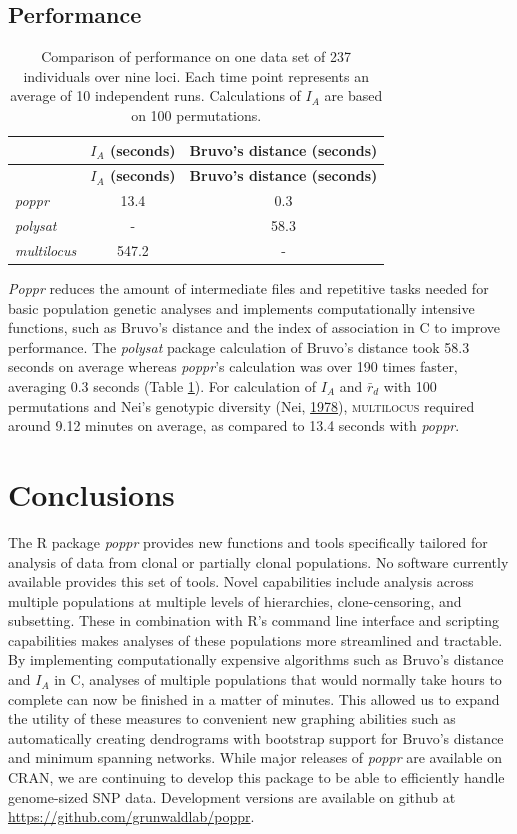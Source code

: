 \documentclass[double,12pt]{beavtex}
\begin{document}
  \subsection{Performance}\label{performance-1}
  
  \begin{longtable}[]{@{}lcc@{}}
  \caption{\label{tab:poppr6} Comparison of performance on one data set of 237
  individuals over nine loci. Each time point represents an average of 10
  independent runs. Calculations of \(I_A\) are based on 100
  permutations.}\tabularnewline
  \toprule
  & \textbf{\(I_A\) (seconds)} & \textbf{Bruvo's distance
  (seconds)}\tabularnewline
  \midrule
  \endfirsthead
  \toprule
  & \textbf{\(I_A\) (seconds)} & \textbf{Bruvo's distance
  (seconds)}\tabularnewline
  \midrule
  \endhead
  \emph{poppr} & 13.4 & 0.3\tabularnewline
  \emph{polysat} & - & 58.3\tabularnewline
  \emph{multilocus} & 547.2 & -\tabularnewline
  \bottomrule
  \end{longtable}
  
  \emph{Poppr} reduces the amount of intermediate files and repetitive
  tasks needed for basic population genetic analyses and implements
  computationally intensive functions, such as Bruvo's distance and the
  index of association in C to improve performance. The \emph{polysat}
  package calculation of Bruvo's distance took 58.3 seconds on average
  whereas \emph{poppr}'s calculation was over 190 times faster, averaging
  0.3 seconds (Table \ref{tab:poppr6}). For calculation of \(I_A\) and
  \(\bar{r}_d\) with 100 permutations and Nei's genotypic diversity (Nei,
  \protect\hyperlink{ref-Nei:1978}{1978}), \textsc{multilocus} required
  around 9.12 minutes on average, as compared to 13.4 seconds with
  \emph{poppr}.
  
  \section{Conclusions}\label{conclusions}
  
  The R package \emph{poppr} provides new functions and tools specifically
  tailored for analysis of data from clonal or partially clonal
  populations. No software currently available provides this set of tools.
  Novel capabilities include analysis across multiple populations at
  multiple levels of hierarchies, clone-censoring, and subsetting. These
  in combination with R's command line interface and scripting
  capabilities makes analyses of these populations more streamlined and
  tractable. By implementing computationally expensive algorithms such as
  Bruvo's distance and \(I_A\) in C, analyses of multiple populations that
  would normally take hours to complete can now be finished in a matter of
  minutes. This allowed us to expand the utility of these measures to
  convenient new graphing abilities such as automatically creating
  dendrograms with bootstrap support for Bruvo's distance and minimum
  spanning networks. While major releases of \emph{poppr} are available on
  CRAN, we are continuing to develop this package to be able to
  efficiently handle genome-sized SNP data. Development versions are
  available on github at \url{https://github.com/grunwaldlab/poppr}.
  
\end{document}
